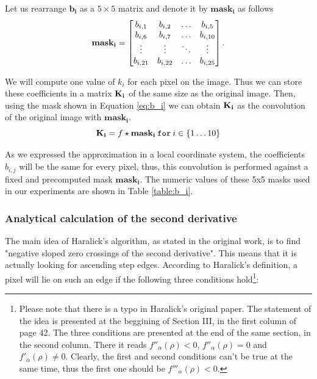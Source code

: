 \documentclass{ipol}
\numberwithin{equation}{section}
\numberwithin{table}{section}
\begin{document}
Let us rearrange $\mathbf{b_i}$ as a $5\times5$ matrix and denote it by $\mathbf{mask_i}$ as follows
\begin{equation}
	\label{eq:b_i}
	\mathbf{mask_i} = \begin{bmatrix}	b_{i,1}		& b_{i,2}	& \hdots	& b_{i,5}	\\
									b_{i,6}		& b_{i,7}	& \hdots	& b_{i,10}	\\
									\vdots		& \vdots	& \ddots	& \vdots	\\
									b_{i,21}	 & b_{i,22}	& \hdots	& b_{i,25}	\\
					\end{bmatrix}.\\
\end{equation}

\vspace{1ex}
We will compute one value of $k_i$ for each pixel on the image. Thus we can store these coefficients in a matrix $\bf{K_i}$ of the same size as the original image. Then, using the mask shown in Equation \ref{eq:b_i} we can obtain $\bf{K_i}$ as the convolution of the original image with $\mathbf{mask_i}$. \\
\begin{equation}
	\label{eq:convolution_b}
	\mathbf{K_i} = f \star \mathbf{mask_i} \: \mathtt{for} \: i \in \{1 \ldots 10\}\\
\end{equation}

As we expressed the approximation in a local coordinate system, the coefficients $b_{i,j}$ will be the same for every pixel, thus, this convolution is performed against a fixed and precomputed mask $\mathbf{mask_i}$. The numeric values of these 5x5 masks used in our experiments are shown in Table \ref{table:b_i}.




\subsubsection{Analytical calculation of the second derivative}
\label{sec:secderivative}

The main idea of Haralick's algorithm, as stated in the original work, is to find "negative sloped zero crossings of the second derivative". This means that it is actually looking for ascending step edges. According to Haralick's definition, a pixel will lie on such an edge if the following three conditions hold\footnote{Please note that there is a typo in Haralick's original paper. The statement of the idea is presented at the beggining of Section III, in the first column of page 42. The three conditions are presented at the end of the same section, in the second column. There it reads $f''_{\alpha}(\rho)<0$, $f''_{\alpha}(\rho)=0$ and $f'_{\alpha}(\rho)\neq 0$. Clearly, the first and second conditions can't be true at the same time, thus the first one should be $f'''_{\alpha}(\rho)<0$.}:
\end{document}
